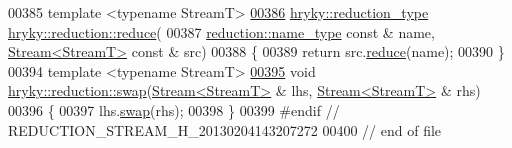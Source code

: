 \begin{DoxyCode}
00385 \textcolor{comment}{}\textcolor{keyword}{template} <\textcolor{keyword}{typename} StreamT>
\hypertarget{reduction__stream_8h_source_l00386}{}\hyperlink{namespacehryky_1_1reduction_ad257dda0d3de13b9f3fd08351883d3a4}{00386} \hyperlink{classhryky_1_1_intrusive_ptr}{hryky::reduction_type} \hyperlink{namespacehryky_1_1reduction_a064022926c530d18aeb1b2abdf71800b}{hryky::reduction::reduce}(
00387     \hyperlink{classhryky_1_1reduction_1_1_string}{reduction::name_type} \textcolor{keyword}{const} & name, \hyperlink{classhryky_1_1reduction_1_1_stream}{Stream<StreamT>} \textcolor{keyword}{const} & src)
00388 \{
00389     \textcolor{keywordflow}{return} src.\hyperlink{classhryky_1_1reduction_1_1_stream_aa60cb1c7a7dc1fb1bc3ab6e57cfa8e34}{reduce}(name);
00390 \}
00394 \textcolor{keyword}{template} <\textcolor{keyword}{typename} StreamT>
\hypertarget{reduction__stream_8h_source_l00395}{}\hyperlink{namespacehryky_1_1reduction_a5c6f7d8075bd118cb0ae0b595748f8a1}{00395} \textcolor{keywordtype}{void} \hyperlink{namespacehryky_1_1reduction_a493c83efdf5f9e9c49ba77e1b65325a1}{hryky::reduction::swap}(\hyperlink{classhryky_1_1reduction_1_1_stream}{Stream<StreamT>} & lhs, \hyperlink{classhryky_1_1reduction_1_1_stream}{Stream<StreamT>} & rhs)
00396 \{
00397     lhs.\hyperlink{classhryky_1_1reduction_1_1_stream_a1149a619a2f584d1ae737010aefb54ca}{swap}(rhs);
00398 \}
00399 \textcolor{preprocessor}{#endif // REDUCTION\_STREAM\_H\_20130204143207272}
00400 \textcolor{preprocessor}{}\textcolor{comment}{// end of file}
\end{DoxyCode}

